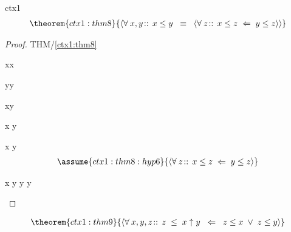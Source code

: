 \documentclass[12pt]{amsart}
\begin{document}
\begin{context}{ctx1}
\begin{align}
\theorem{ctx1:thm8}{ \qforall{x,y}{}{ x\le y \2\equiv 
	\qforall{z}{}{x \le z \1\follows y \le z } } }
\end{align}

\begin{proof}{THM/\ref{ctx1:thm8}}
	\begin{free:var}{x}{x}
	\begin{free:var}{y}{y} \\
\begin{by:parts}
\begin{part:a}{ x\le y \2\implies 
		 }
\begin{calculation}
	\hint{\follows}{ \eqref{ctx1:thm6} }
		x  \le y
\end{calculation}
\end{part:a}
\begin{part:a}{ x \le y \2\follows
		 }
	\begin{align}
	\assume{ctx1:thm8:hyp6}{ \qforall{z}{}{x \le z \1\follows y \le z } }
	\end{align}
\begin{calculation}
		x \le y
	\hint{\follows}{ \eqref{ctx1:thm8:hyp6} }
		y  \le y
	\hint{=}{ \eqref{ctx1:axm0} }
		\true
\end{calculation}
\end{part:a}
\end{by:parts}
	\end{free:var}
	\end{free:var}
\end{proof}

\begin{align}
\theorem{ctx1:thm9}{ \qforall{x,y,z}{ }{ z \1\le x \uparrow y \2\follows z \le x \1\lor z\le y  } }
\end{align}


\end{context}
\end{document}
